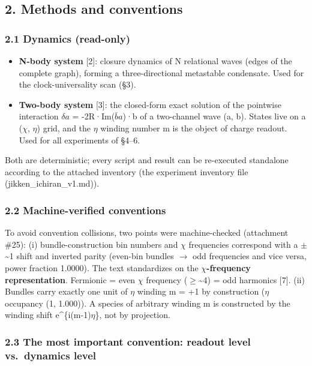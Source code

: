 \documentclass[
]{article}
\providecommand{\tightlist}{%
  \setlength{\itemsep}{0pt}\setlength{\parskip}{0pt}}
\begin{document}
\subsection{2. Methods and conventions}\label{methods-and-conventions}

\subsubsection{2.1 Dynamics (read-only)}\label{dynamics-read-only}

\begin{itemize}
\tightlist
\item
  \textbf{N-body system} {[}2{]}: closure dynamics of N relational waves
  (edges of the complete graph), forming a three-directional metastable
  condensate. Used for the clock-universality scan (§3).
\item
  \textbf{Two-body system} {[}3{]}: the closed-form exact solution of
  the pointwise interaction \(\delta a\) = -2R·Im(\(\bar b a\))·b of a
  two-channel wave (a, b). States live on a (\(\chi\), \(\eta\)) grid,
  and the \(\eta\) winding number m is the object of charge readout.
  Used for all experiments of §4--6.
\end{itemize}

Both are deterministic; every script and result can be re-executed
standalone according to the attached inventory (the experiment inventory
file (jikken\_ichiran\_v1.md)).

\subsubsection{2.2 Machine-verified
conventions}\label{machine-verified-conventions}

To avoid convention collisions, two points were machine-checked
(attachment \#25): (i) bundle-construction bin numbers and \(\chi\)
frequencies correspond with a \(\pm\)\textasciitilde1 shift and inverted
parity (even-bin bundles \(\to\) odd frequencies and vice versa, power
fraction 1.0000). The text standardizes on the
\textbf{\(\chi\)-frequency representation}. Fermionic = even \(\chi\)
frequency (\(\ge\)\textasciitilde4) = odd harmonics {[}7{]}. (ii)
Bundles carry exactly one unit of \(\eta\) winding m = +1 by
construction (\(\eta\) occupancy (1, 1.000)). A species of arbitrary
winding m is constructed by the winding shift e\^{}\{i(m-1)\(\eta\)\},
not by projection.

\subsubsection{2.3 The most important convention: readout level
vs.~dynamics
level}\label{the-most-important-convention-readout-level-vs.-dynamics-level}
\end{document}

